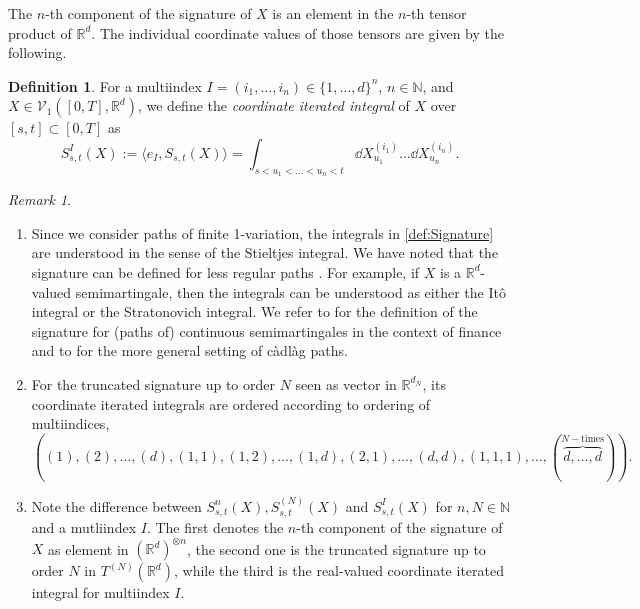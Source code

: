 \documentclass[
    a4paper,
    11pt,
    bibliography=totoc,
    listof=totoc,      
    headinclude=true,
    cleardoublepage=empty,
]{scrbook}
\theoremstyle{plain}
\theoremstyle{definition}
\newtheorem{definition}[theorem]{Definition}
\theoremstyle{remark}
\newtheorem{remark}[theorem]{Remark}
\newcommand{\SetR}{\mathbb R}
\newcommand{\SetN}{\mathbb N}
\begin{document}
The $n$-th component of the signature of $X$ is an element in the $n$-th 
tensor product of $\SetR^d$. The individual coordinate values of those tensors 
are given by the following.

\begin{definition}%
\label{def:CoordinateInteratedIntegrals}
    For a multiindex $I=(i_1,\dots,i_n) \in\{1,\dots,d\}^n$, $n\in\SetN$,
    and $X\in\mathcal{V}_1([0,T], \SetR^d)$, we define the \textit{coordinate
    iterated integral} of $X$ over $[s,t]\subset [0,T]$ as
    \begin{equation}
        S_{s,t}^I(X) := \big\langle e_I, S_{s,t}(X) \big\rangle
        = \int_{s<u_1<\dots<u_n<t} \dd{X^{(i_1)}_{u_1}} \dots
            \dd{X^{(i_n)}_{u_n}}.
    \end{equation}
\end{definition}

\begin{remark}
    \begin{enumerate}
        \item Since we consider paths of finite 1-variation, the integrals
        in \cref{def:Signature} are understood in the sense of the Stieltjes
        integral. We have noted that the signature can be defined for less regular paths \cite{lyons2007_dedrp}. For example, if $X$ is a 
        $\SetR^d$-valued semimartingale, then the integrals can be understood
        as either the Itô integral or the Stratonovich integral. We refer to
        \cite{cuchiero2023_smtc} for the definition of the signature for (paths
        of) continuous semimartingales in the context of finance and to
        \cite{cuchiero2025_uatcfcplsm, friz2017_grilrplf} for the more general
        setting of c\`adl\`ag paths.
        
        \item For the truncated signature up to order $N$ seen as vector 
        in $\SetR^{d_N}$, its coordinate iterated integrals are ordered according to ordering of multiindices,
        \[
            ((1),(2),\dots,(d),
            (1,1),(1,2),\dots,(1,d),(2,1),\dots,(d,d),
            (1,1,1),\dots, 
            (\overbrace{d,\dots,d}^{N-\text{times}})).
        \]
        \item Note the difference between $S^n_{s,t}(X), 
            S^{(N)}_{s,t}(X)$ and $S^I_{s,t}(X)$ for $n,N\in\SetN$ and a 
            mutliindex $I$. The first denotes the $n$-th component of the 
            signature of $X$ as element in $(\SetR^d)^{\otimes n}$, the
            second one is the truncated signature up to order $N$ in $T^{(N)}
            (\SetR^d)$, while the third is the real-valued coordinate
            iterated integral for multiindex $I$.
    \end{enumerate}
\end{remark}
\end{document}
